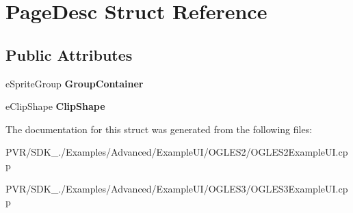 \hypertarget{struct_page_desc}{\section{Page\+Desc Struct Reference}
\label{struct_page_desc}
}
\subsection*{Public Attributes}
\begin{DoxyCompactItemize}
\item 
\hypertarget{struct_page_desc_a88576c04205f2bc77858e7854c78dbc0}{e\+Sprite\+Group {\bfseries Group\+Container}}\label{struct_page_desc_a88576c04205f2bc77858e7854c78dbc0}

\item 
\hypertarget{struct_page_desc_a886d60bf2d9bc1fdad132597f65f28af}{e\+Clip\+Shape {\bfseries Clip\+Shape}}\label{struct_page_desc_a886d60bf2d9bc1fdad132597f65f28af}

\end{DoxyCompactItemize}


The documentation for this struct was generated from the following files\+:\begin{DoxyCompactItemize}
\item 
P\+V\+R/\+S\+D\+K\+\_./\+Examples/\+Advanced/\+Example\+U\+I/\+O\+G\+L\+E\+S2/O\+G\+L\+E\+S2\+Example\+U\+I.\+cpp\item 
P\+V\+R/\+S\+D\+K\+\_./\+Examples/\+Advanced/\+Example\+U\+I/\+O\+G\+L\+E\+S3/O\+G\+L\+E\+S3\+Example\+U\+I.\+cpp\end{DoxyCompactItemize}
